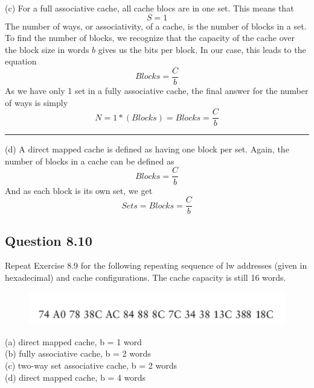 \documentclass[12pt, letter]{article}
\begin{document}
	(c) For a full associative cache, all cache blocs are in one set. This means that 
	\begin{equation}
		S = 1
	\end{equation}
	The number of ways, or associativity, of a cache, is the number of blocks in a set. To find the number of blocks, we recognize that the capacity of the cache over the block size in words $b$ gives us the bits per block. In our case, this leads to the equation
	\begin{equation}
		Blocks = \frac{C}{b}
	\end{equation}
	As we have only 1 set in a fully associative cache, the final answer for the number of ways is simply
	\begin{equation}
		N = 1 * (Blocks) = Blocks = \frac{C}{b}
	\end{equation}
	\hrule
	\bigskip
	
	(d) A direct mapped cache is defined as having one block per set. Again, the number of blocks in a cache can be defined as 
	\begin{equation}
		Blocks = \frac{C}{b}
	\end{equation}
	And as each block is its own set, we get
	\begin{equation}
		Sets = Blocks = \frac{C}{b}
	\end{equation}
	
	\subsection{Question 8.10}
	\begin{tcolorbox}[colback = bg, boxrule = 0pt]
		 Repeat Exercise 8.9 for the following repeating sequence of lw addresses (given in hexadecimal) and cache configurations. The cache capacity is still 16 words.
	\end{tcolorbox}
	\begin{figure}[h]
		\centering
		\includegraphics[scale=0.8]{Exercise8.10}
	\end{figure}
	\begin{tcolorbox}[colback = bg, boxrule = 0pt]
		(a) direct mapped cache, b = 1 word\\
		(b) fully associative cache, b = 2 words\\
		(c) two-way set associative cache, b = 2 words\\
		(d) direct mapped cache, b = 4 words
	\end{tcolorbox}
	
\end{document}
